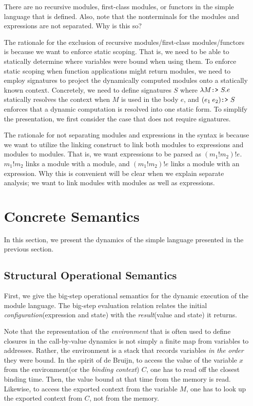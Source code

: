 \documentclass[acmsmall,review]{acmart}\settopmatter{printfolios=true,printccs=false,printacmref=false}
\theoremstyle{definition}
\newcommand*{\link}[2]{{#1}\mathtt{!}{#2}}
\newcommand*{\project}{\text{\texttt{:>} }}
\begin{document}
There are no recursive modules, first-class modules, or functors in the simple language that is defined.
Also, note that the nonterminals for the modules and expressions are not separated. Why is this so?

The rationale for the exclusion of recursive modules/first-class modules/functors is because we want to enforce static scoping.
That is, we need to be able to statically determine where variables were bound when using them.
To enforce static scoping when function applications might return modules, we need to employ signatures to project the dynamically computed modules onto a statically known context.
Concretely, we need to define signatures $S$ where $\lambda M\project S.e$ statically resolves the context when $M$ is used in the body $e$, and $(e_1\:e_2)\project S$ enforces that a dynamic computation is resolved into one static form.
To simplify the presentation, we first consider the case that does not require signatures.

The rationale for not separating modules and expressions in the syntax is because we want to utilize the linking construct to link both modules to expressions and modules to modules.
That is, we want expressions to be parsed as $(m_1!m_2)!e$.
$\link{m_1}{m_2}$ links a module with a module, and $(m_1!m_2)!e$ links a module with an expression.
Why this is convenient will be clear when we explain separate analysis; we want to link modules with modules as well as expressions.

\section{Concrete Semantics}

In this section, we present the dynamics of the simple language presented in the previous section.

\subsection{Structural Operational Semantics}

First, we give the big-step operational semantics for the dynamic execution of the module language.
The big-step evaluation relation relates the initial \emph{configuration}(expression and state) with the \emph{result}(value and state) it returns.

Note that the representation of the \emph{environment} that is often used to define closures in the call-by-value dynamics is not simply a finite map from variables to addresses.
Rather, the environment is a stack that records variables \emph{in the order} they were bound.
In the spirit of de Bruijn, to access the value of the variable $x$ from the environment(or the \emph{binding context}) $C$, one has to read off the closest binding time.
Then, the value bound at that time from the memory is read.
Likewise, to access the exported context from the variable $M$, one has to look up the exported context from $C$, not from the memory.
\end{document}
